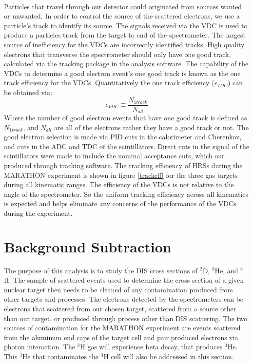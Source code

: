 \paragraph{}Particles that travel through our detector could originated from sources wanted or unwanted. In order to control the source of the scattered electrons, we use a particle's track to identify its source. The signals received via the VDC is used to produce a particles track from the target to end of the spectrometer. The largest source of inefficiency for the VDCs are incorrectly identified tracks. High quality electrons that transverse the spectrometer should only have one good track, calculated via the tracking package in the analysis software. The capability of the VDCs to determine a good electron event's one good track is known as the one track efficiency for the VDCs. Quantitatively the one track efficiency ($\epsilon_{VDC}$) can be obtained via:
\begin{equation}
\epsilon_{VDC} \equiv \frac{N_{1 track} }{N_{all}}
\end{equation}
Where the number of good electron events that have one good track is defined as $N_{1 track}$, and $N_{all}$ are all of the electrons rather they have a good track or not. The good electron selection is made via PID cuts in the calorimeter and Cherenkov, and cuts in the ADC and TDC of the scintillators. Direct cuts in the signal of the scintillators were made to include the nominal acceptance cuts, which our produced through tracking software. The tracking efficiency of HRSs during the MARATHON experiment is shown in figure \ref{trackeff} for the three gas targets during all kinematic ranges. The efficiency of the VDCs is not relative to the angle of the spectrometer. So the uniform tracking efficiency across all kinematics is expected and helps eliminate any concerns of the performance of the VDCs during the experiment. 

\section{Background Subtraction}\label{sec:BG}
\paragraph{} The purpose of this analysis is to study the DIS cross sections of $^2$D, $^3$He, and $^3$H. The sample of scattered events used to determine the cross section of a given nuclear target then needs to be cleaned of any contamination produced from other targets and processes. The electrons detected by the spectrometers can be electrons that scattered from our chosen target, scattered from a source other than our target, or produced through process other than DIS scattering. The two sources of contamination for the MARATHON experiment are events scattered from the aluminum end caps of the target cell and pair produced electrons via photon interaction. The $^3$H gas will experience beta decay, that produces $^3$He. This $^3$He that contaminates the $^3$H cell will also be addressed in this section.
